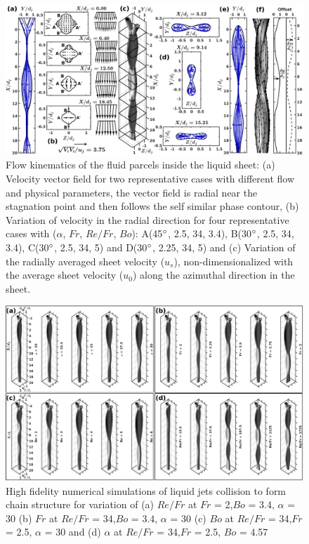 \documentclass{jfm}
\begin{document}
\clearpage
\begin{figure}
	\centering
	\includegraphics[width=\linewidth]{Figure5}
	\caption{Flow kinematics of the fluid parcels inside the liquid sheet: (a) Velocity vector field for two representative cases with different flow and physical parameters, the vector field is radial near the stagnation point and then follows the self similar phase contour, (b) Variation of velocity in the radial direction for four representative cases with ($\alpha$, $Fr$, $Re/Fr$, $Bo$): A(45$\degree$, 2.5, 34, 3.4), B(30$\degree$, 2.5, 34, 3.4), C(30$\degree$, 2.5, 34, 5) and D(30$\degree$, 2.25, 34, 5) and (c) Variation of the radially averaged sheet velocity ($u_s$), non-dimensionalized with the average sheet velocity ($u_0$) along the azimuthal direction in the sheet.}
	\label{Figure::streamDetails}
\end{figure}
\clearpage
\begin{figure}
	\centering
	\includegraphics[width=\linewidth]{Figure6}
	\caption{High fidelity numerical simulations of liquid jets collision to form chain structure for variation of (a) $Re/Fr$ at $Fr$ = 2,$Bo$ = 3.4, $\alpha$ = 30 (b) $Fr$ at $Re/Fr$ = 34,$Bo$ = 3.4, $\alpha$ =  30 (c) $Bo$ at $Re/Fr$ = 34,$Fr$ = 2.5, $\alpha$ = 30 and (d) $\alpha$ at $Re/Fr$ = 34,$Fr$ = 2.5, $Bo$ = 4.57}
	\label{Figure::phaseContours}
\end{figure}
\end{document}
